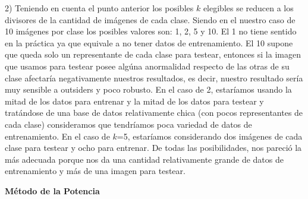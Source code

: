 2) Teniendo en cuenta el punto anterior los posibles $k$ elegibles se reducen a los divisores de la cantidad de imágenes de cada clase. Siendo en el nuestro caso de 10 imágenes por clase los posibles valores son: 1, 2, 5 y 10. El 1 no tiene sentido en la práctica ya que equivale a no tener datos de entrenamiento. El 10 supone que queda solo un representante de cada clase para testear, entonces si la imagen que usamos para testear posee algúna anormalidad respecto de las otras de su clase afectaría negativamente nuestros resultados, es decir, nuestro resultado sería muy sensible a outsiders y poco robusto. En el caso de 2, estaríamos usando la mitad de los datos para entrenar y la mitad de los datos para testear y tratándose de una base de datos relativamente chica (con pocos representantes de cada clase) consideramos que tendríamos poca variedad de datos de entrenamiento. En el caso de $k$=5, estaríamos considerando dos imágenes de cada clase para testear y ocho para entrenar. De todas las posibilidades, nos pareció la más adecuada porque nos da una cantidad relativamente grande de datos de entrenamiento y más de una imagen para testear. 

\textbf{Método de la Potencia}
